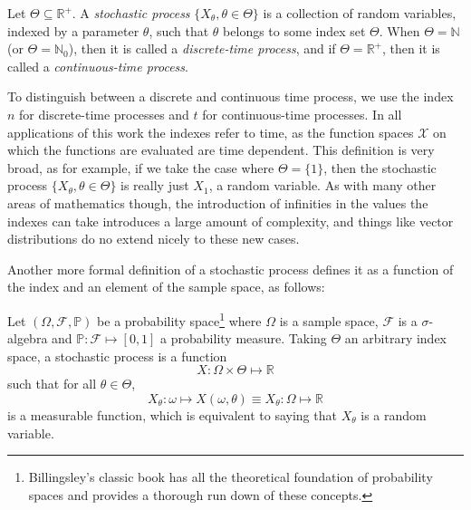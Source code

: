 \begin{definition}
	Let $\Theta \subseteq \mathbb{R}^+$. A \textit{stochastic process} $\{ X_\theta, \theta \in \Theta \}$ is a collection of random variables, indexed by a parameter $\theta$, such that $\theta$ belongs to some index set $\Theta$. When $\Theta = \mathbb{N}$ (or $\Theta = \mathbb{N}_0$), then it is called a \textit{discrete-time process}, and if $\Theta = \mathbb{R}^+$, then it is called a \textit{continuous-time process}. 
\end{definition}

To distinguish between a discrete and continuous time process, we use the index $n$ for discrete-time processes and $t$ for continuous-time processes. 
In all applications of this work the indexes refer to time, as the function spaces $\mathcal{X}$ on which the functions are evaluated are time dependent. 
This definition is very broad, as for example, if we take the case where $\Theta = \{1\}$, then the stochastic process $\{ X_\theta, \theta \in \Theta \}$ is really just $X_1$, a random variable. 
As with many other areas of mathematics though, the introduction of infinities in the values the indexes can take introduces a large amount of complexity, and things like vector distributions do no extend nicely to these new cases. 

Another more formal definition of a stochastic process defines it as a function of the index and an element of the sample space, as follows: 

\begin{definition}
	Let $(\Omega, \mathcal{F}, \mathbb{P})$ be a probability space\footnote{Billingsley's classic book \cite{billingsley2012probability} has all the theoretical foundation of probability spaces and provides a thorough run down of these concepts.} where $\Omega$ is a sample space, $\mathcal{F}$ is a $\sigma$-algebra  and $\mathbb{P}: \mathcal{F} \mapsto [0,1]$ a probability measure. Taking $\Theta$ an arbitrary index space, a stochastic process is a function 
	\[ X: \Omega \times \Theta \mapsto \mathbb{R} \]
	such that for all  $\theta \in \Theta$,
	\[ X_\theta : \omega \mapsto X(\omega, \theta) \equiv X_\theta : \Omega \mapsto \mathbb{R} \]
	is a measurable function, which is equivalent to saying that $X_\theta$ is a random variable.
\end{definition}


